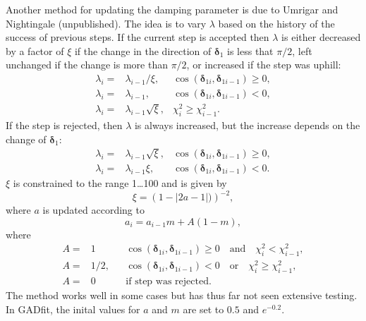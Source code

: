 \documentclass{article}
\begin{document}
Another method for updating the damping parameter is due to Umrigar and Nightingale (unpublished). The idea is to vary $\lambda$ based on the history of the success of previous steps. If the current step is accepted then $\lambda$ is either decreased by a factor of $\xi$ if the change in the direction of $\bm\delta_1$ is less that $\pi/2$, left unchanged if the change is more than $\pi/2$, or increased if the step was uphill:
\begin{align}
  \label{eq:umnigh_lambda_acc}
  \lambda_i =& \lambda_{i-1}/\xi,
  & \cos(\bm\delta_{1i},\bm\delta_{1i-1}) \ge 0, \\
  \lambda_i =& \lambda_{i-1}, & \cos(\bm\delta_{1i},\bm\delta_{1i-1})
                                < 0, \\
  \lambda_i =& \lambda_{i-1}\sqrt{\xi}, & \chi_i^2 \ge \chi_{i-1}^2.
\end{align}
If the step is rejected, then $\lambda$ is always increased, but the
increase depends on the change of $\bm\delta_1$:
\begin{align}
  \label{eq:umnigh_lambda_rej}
  \lambda_i =& \lambda_{i-1}\sqrt{\xi},
  & \cos(\bm\delta_{1i},\bm\delta_{1i-1}) \ge 0, \\
  \lambda_i =& \lambda_{i-1}\xi, & \cos(\bm\delta_{1i},\bm\delta_{1i-1})
                                   < 0.
\end{align}
$\xi$ is constrained to the range 1\ldots100 and is given by
\begin{equation}
  \label{eq:umnigh_xi}
  \xi = \left( 1-|2a-1|) \right)^{-2},
\end{equation}
where $a$ is updated according to
\begin{equation}
  \label{eq:umnigh_a_update}
  a_i = a_{i-1}m + A(1-m),
\end{equation}
where
\begin{align}
  \label{eq:umnigh_A_update}
  A =& 1 && \cos(\bm\delta_{1i},\bm\delta_{1i-1}) \ge 0 \quad
            \text{and} \quad \chi_i^2 < \chi_{i-1}^2, \\
  A =& 1/2, && \cos(\bm\delta_{1i},\bm\delta_{1i-1})
               < 0 \quad \text{or} \quad \chi_i^2 \ge \chi_{i-1}^2, \\
  A =& 0 && \text{if step was rejected}.
\end{align}
The method works well in some cases but has thus far not seen extensive testing. In GADfit, the inital values for $a$ and $m$ are set to $0.5$ and $e^{-0.2}$.
\end{document}
